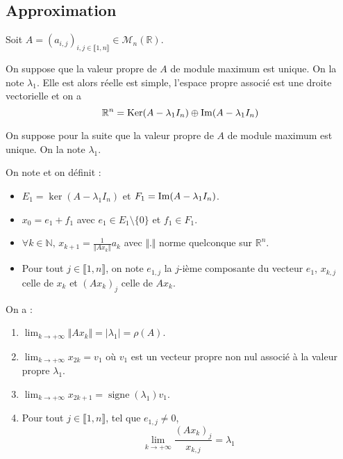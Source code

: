   \subsection{Approximation}
  
  Soit $A = (a_{i,j})_{i, j \in \llbracket 1, n \rrbracket} \in \mathcal{M}_n(\mathbb{R})$.
  
  
  \begin{theorem}
    On suppose que la valeur propre de $A$ de module maximum est unique. On la note $\lambda_1$. Elle est alors réelle est simple, l'espace propre associé est une droite vectorielle et on a
    \[ \mathbb{R}^n = \mathrm{Ker}(A-\lambda_1 I_n) \oplus \mathrm{Im}(A-\lambda_1 I_n) \]
  \end{theorem}
  
  On suppose pour la suite que la valeur propre de $A$ de module maximum est unique. On la note $\lambda_1$.
  
  \begin{notation}
    On note et on définit :
    \begin{itemize}
      \item $E_1 = \ker(A-\lambda_1 I_n)$ et $F_1 = \mathrm{Im}(A-\lambda_1 I_n)$.
      \item $x_0 = e_1 + f_1$ avec $e_1 \in E_1 \setminus \{ 0 \}$ et $f_1 \in F_1$.
      \item $\forall k \in \mathbb{N}, \, x_{k+1} = \frac{1}{\Vert A x_k \Vert} a_k$ avec $\Vert . \Vert$ norme quelconque sur $\mathbb{R}^n$.
      \item Pour tout $j \in \llbracket 1,n \rrbracket$, on note $e_{1,j}$ la $j$-ième composante du vecteur $e_1$, $x_{k,j}$ celle de $x_k$ et $(Ax_k)_j$ celle de $Ax_k$.
    \end{itemize}
  \end{notation}
  
  \begin{theorem}
    On a :
    \begin{enumerate}[label=(\roman*)]
      \item $\lim_{k \rightarrow +\infty} \Vert A x_k \Vert = \vert \lambda_1 \vert = \rho(A)$.
      \item $\lim_{k \rightarrow +\infty} x_{2k} = v_1$ où $v_1$ est un vecteur propre non nul associé à la valeur propre $\lambda_1$.
      \item $\lim_{k \rightarrow +\infty} x_{2k+1} = \operatorname{signe}(\lambda_1) v_1$.
      \item Pour tout $j \in \llbracket 1,n \rrbracket$, tel que $e_{1,j} \neq 0$,
      \[ \lim_{k \rightarrow +\infty} \frac{(A x_k)_j}{x_{k,j}} = \lambda_1 \]
    \end{enumerate}
  \end{theorem}
  
